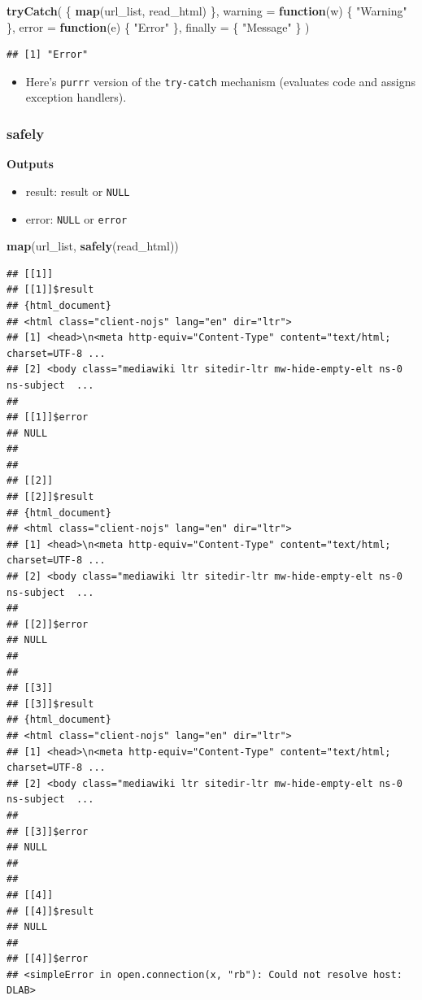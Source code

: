 \documentclass[
]{book}
\newenvironment{Shaded}{\begin{snugshade}}{\end{snugshade}}
\newcommand{\AttributeTok}[1]{\textcolor[rgb]{0.13,0.29,0.53}{#1}}
\newcommand{\ControlFlowTok}[1]{\textcolor[rgb]{0.13,0.29,0.53}{\textbf{#1}}}
\newcommand{\FunctionTok}[1]{\textcolor[rgb]{0.13,0.29,0.53}{\textbf{#1}}}
\newcommand{\NormalTok}[1]{#1}
\newcommand{\StringTok}[1]{\textcolor[rgb]{0.31,0.60,0.02}{#1}}
\providecommand{\tightlist}{%
  \setlength{\itemsep}{0pt}\setlength{\parskip}{0pt}}
\begin{document}
\begin{Shaded}
\begin{Highlighting}[]
\FunctionTok{tryCatch}\NormalTok{(}
\NormalTok{  \{}
    \FunctionTok{map}\NormalTok{(url\_list, read\_html)}
\NormalTok{  \},}
  \AttributeTok{warning =} \ControlFlowTok{function}\NormalTok{(w) \{}
    \StringTok{"Warning"}
\NormalTok{  \},}
  \AttributeTok{error =} \ControlFlowTok{function}\NormalTok{(e) \{}
    \StringTok{"Error"}
\NormalTok{  \},}
  \AttributeTok{finally =}\NormalTok{ \{}
    \StringTok{"Message"}
\NormalTok{  \}}
\NormalTok{)}
\end{Highlighting}
\end{Shaded}

\begin{verbatim}
## [1] "Error"
\end{verbatim}

\begin{itemize}
\tightlist
\item
  Here's \texttt{purrr} version of the \texttt{try-catch} mechanism (evaluates code and assigns exception handlers).
\end{itemize}

\subsubsection{safely}\label{safely}

\textbf{Outputs}

\begin{itemize}
\tightlist
\item
  result: result or \texttt{NULL}
\item
  error: \texttt{NULL} or \texttt{error}
\end{itemize}

\begin{Shaded}
\begin{Highlighting}[]
\FunctionTok{map}\NormalTok{(url\_list, }\FunctionTok{safely}\NormalTok{(read\_html))}
\end{Highlighting}
\end{Shaded}

\begin{verbatim}
## [[1]]
## [[1]]$result
## {html_document}
## <html class="client-nojs" lang="en" dir="ltr">
## [1] <head>\n<meta http-equiv="Content-Type" content="text/html; charset=UTF-8 ...
## [2] <body class="mediawiki ltr sitedir-ltr mw-hide-empty-elt ns-0 ns-subject  ...
## 
## [[1]]$error
## NULL
## 
## 
## [[2]]
## [[2]]$result
## {html_document}
## <html class="client-nojs" lang="en" dir="ltr">
## [1] <head>\n<meta http-equiv="Content-Type" content="text/html; charset=UTF-8 ...
## [2] <body class="mediawiki ltr sitedir-ltr mw-hide-empty-elt ns-0 ns-subject  ...
## 
## [[2]]$error
## NULL
## 
## 
## [[3]]
## [[3]]$result
## {html_document}
## <html class="client-nojs" lang="en" dir="ltr">
## [1] <head>\n<meta http-equiv="Content-Type" content="text/html; charset=UTF-8 ...
## [2] <body class="mediawiki ltr sitedir-ltr mw-hide-empty-elt ns-0 ns-subject  ...
## 
## [[3]]$error
## NULL
## 
## 
## [[4]]
## [[4]]$result
## NULL
## 
## [[4]]$error
## <simpleError in open.connection(x, "rb"): Could not resolve host: DLAB>
\end{verbatim}
\end{document}
